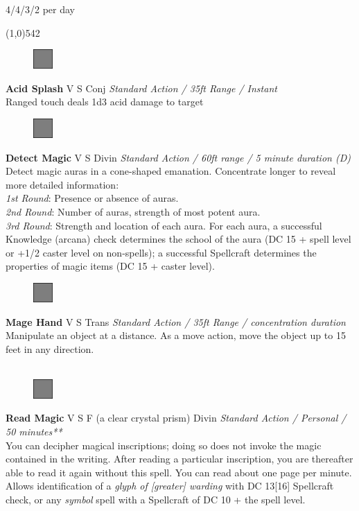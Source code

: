 \documentclass[letterpaper]{article}
\newcommand{\fullline}{\noindent\line(1,0){542} \\}
\newcommand{\spell}[7]{
\begin{figure}
\vspace{-13pt}
\ifstrequal{#2}{Full}{\includegraphics[width=2em]{Checkbox-Full}}{
                      \includegraphics[width=2em]{Checkbox}}
\ifstrequal{#7}{}{\vspace{-1em}}{\vspace{#7}}
\end{figure}
\noindent \textbf{#1} #3 {
    \ifstrequal{#4}{Conj}{\color{Plum}Conj}{%
    \ifstrequal{#4}{Divin}{\color{YellowOrange}Divin}{%
    \ifstrequal{#4}{Ench}{\color{VioletRed}Ench}{%
    \ifstrequal{#4}{Trans}{\color{LimeGreen}Trans}{%
    \ifstrequal{#4}{Evoc}{\color{RedOrange}Evoc}{%
    \ifstrequal{#4}{Illu}{\color{ProcessBlue}Illu}{%
    \ifstrequal{#4}{Abjur}{\color{CadetBlue}Abjur}{%
    \ifstrequal{#4}{Necro}{\color{Red}Necro}{%
}}}}}}}}}
{\footnotesize \emph{#5}} \\
#6
}
\begin{document}
\pagebreak

 \hspace{2em}4/4/3/2 per day\par
\vspace{-0.5em}
\fullline
\vspace{-1.25em}

\spell{Acid Splash}{Full}{V S}{Conj}{Standard Action / 35ft Range / Instant}{
Ranged touch deals 1d3 acid damage to target}{}\\[-1em] %


\spell{Detect Magic}{Full}{V S}{Divin}{Standard Action / 60ft range / 5 minute duration (D)}{
Detect magic auras in a cone-shaped emanation.  Concentrate longer to reveal more detailed information:\\
\emph{1st Round}: Presence or absence of auras.\\
\emph{2nd Round}: Number of auras, strength of most potent aura.\\
\emph{3rd Round}: Strength and location of each aura.  For each aura, a successful Knowledge (arcana) check determines the school of the aura (DC 15 + spell level or +1/2 caster level on non-spells); a successful Spellcraft determines the properties of magic items (DC 15 + caster level).}{3em} %



\spell{Mage Hand}{Full}{V S}{Trans}{Standard Action / 35ft Range / concentration duration}{%
Manipulate an object at a distance. As a move action, move the object up to 15 feet in any direction.\\}{}\\[-2em] %

\spell{Read Magic}{Full}{V S F (a clear crystal prism)}{Divin}{Standard Action / Personal / 50 minutes**}{
You can decipher magical inscriptions; doing so does not invoke the magic contained in the writing.  After reading a particular inscription, you are thereafter able to read it again without this spell.  You can read about one page per minute. Allows identification of a \emph{glyph of [greater] warding} with DC 13[16] Spellcraft check, or any \emph{symbol} spell with a Spellcraft of DC 10 + the spell level.}{1em}\\[-2em] %
\end{document}
